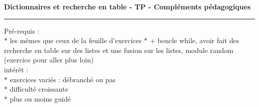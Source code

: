 \documentclass[a4paper,12pt,dvips]{article}
\begin{document}
 \begin{center}
\large\textbf{Dictionnaires et recherche en table - TP - Compléments pédagogiques}
\end{center}
 \hrule\vspace{\baselineskip}
 \normalsize
 Pré-requis : \\
  $\ast$ les mêmes que ceux de la feuille d'exercices 
 $\ast$ + boucle while, avoir fait des recherche en table sur des listes et une fusion sur les listes, module random (exercice pour aller plus loin)\\


intérêt :\\
$\ast$ exercices variés : débranché ou pas\\
$\ast$ difficulté croissante\\
$\ast$ plus ou moins guidé \\
\end{document}
